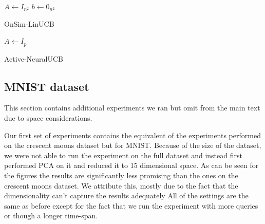 \documentclass{article}
\begin{document}
  \begin{algorithm}
    $A \gets I_{n^2}$\;
    $b \gets 0_{n^2}$\;
    \caption{OnSim-LinUCB}\label{algo:onsim-linucb}
\end{algorithm}



\begin{algorithm}
    $A \gets I_{p}$\;
    \caption{Active-NeuralUCB}\label{algo:active-neuralucb}
  \end{algorithm}

\newpage
\subsection{MNIST dataset}
\label{sec:additional-experiments}
This section contains additional experiments we ran but omit from the main text due to
space considerations.

Our first set of experiments contains the equivalent of the experiments performed on the crescent moons dataset
but for MNIST.
Because of the size of the dataset, we were not able to run the experiment on the full dataset and instead
first performed PCA on it and reduced it to 15 dimensional space.
As can be seen for the figures the results are significantly less promising than the ones on the crescent moons dataset.
We attribute this, mostly due to the fact that the dimensionality can't capture the results adequately
All of the settings are the same as before except for the fact that we run the experiment with more queries or though a longer time-span.
\end{document}
